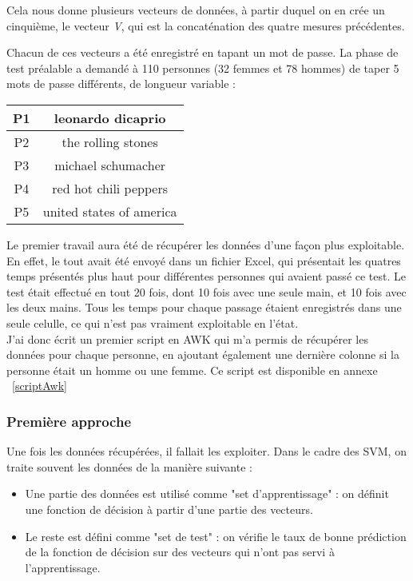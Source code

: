 Cela nous donne plusieurs vecteurs de données, à partir duquel on en crée un cinquième, le vecteur \textit{V}, qui est la concaténation des quatre mesures précédentes. 

\bigskip
Chacun de ces vecteurs a été enregistré en tapant un mot de passe. La phase de test préalable a demandé à 110 personnes (32 femmes et 78 hommes) de taper 5 mots de passe différents, de longueur variable :
\begin{center}\begin{tabular}{|c|c|}
\hline
P1 & leonardo dicaprio\\
\hline
P2 & the rolling stones \\
\hline
P3 & michael schumacher \\
\hline
P4 & red hot chili peppers \\
\hline
P5 & united states of america \\
\hline
\end{tabular}\end{center}

\bigskip
Le premier travail aura été de récupérer les données d'une façon plus exploitable. En effet, le tout avait été envoyé dans un fichier Excel, qui présentait les quatres temps présentés plus haut pour différentes personnes qui avaient passé ce test. Le test était effectué en tout 20 fois, dont 10 fois avec une seule main, et 10 fois avec les deux mains. Tous les temps pour chaque passage étaient enregistrés dans une seule celulle, ce qui n'est pas vraiment exploitable en l'état.\\
J'ai donc écrit un premier script en AWK qui m'a permis de récupérer les données pour chaque personne, en ajoutant également une dernière colonne si la personne était un homme ou une femme. Ce script est disponible en annexe ~\ref{scriptAwk}


\subsubsection{Première approche}
Une fois les données récupérées, il fallait les exploiter. Dans le cadre des SVM, on traite souvent les données de la manière suivante :
\begin{itemize}
	\item Une partie des données est utilisé comme "set d'apprentissage" : on définit une fonction de décision à partir d'une partie des vecteurs.
	\item Le reste est défini comme "set de test" : on vérifie le taux de bonne prédiction de la fonction de décision sur des vecteurs qui n'ont pas servi à l'apprentissage.
\end{itemize}

